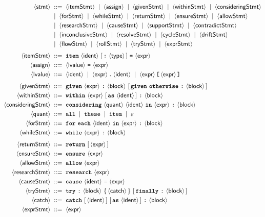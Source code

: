 \documentclass[11pt,a4paper]{article}
\theoremstyle{plain}
\theoremstyle{definition}
\theoremstyle{remark}
\newcommand{\nt}[1]{\ensuremath{\langle\textsf{#1}\rangle}}  %
\newcommand{\tm}[1]{\textbf{\texttt{#1}}}                 %
\newcommand{\opt}[1]{\ensuremath{[\,#1\,]}}               %
\newcommand{\rep}[1]{\ensuremath{\{\,#1\,\}}}             %
\newcommand{\bnfeq}{\;::=\;}
\newcommand{\bnfor}{\;\mid\;}
\begin{document}
\begin{align*}
\nt{stmt}      &\bnfeq \nt{itemStmt} \bnfor \nt{assign} \bnfor \nt{givenStmt}
                       \bnfor \nt{withinStmt} \bnfor \nt{consideringStmt}\\
               &\bnfor \nt{forStmt} \bnfor \nt{whileStmt} \bnfor \nt{returnStmt}
                       \bnfor \nt{ensureStmt} \bnfor \nt{allowStmt}\\
               &\bnfor \nt{researchStmt} \bnfor \nt{causeStmt}
                       \bnfor \nt{supportStmt} \bnfor \nt{contradictStmt}\\
               &\bnfor \nt{inconclusiveStmt} \bnfor \nt{resolveStmt}
                       \bnfor \nt{cycleStmt} \bnfor \nt{driftStmt}\\
               &\bnfor \nt{flowStmt} \bnfor \nt{rollStmt} \bnfor \nt{tryStmt}
                       \bnfor \nt{exprStmt}\\[4pt]
\nt{itemStmt}  &\bnfeq \tm{item}\ \nt{ident}\ \opt{\texttt{:}\ \nt{type}}\
                       \texttt{=}\ \nt{expr}\\
\nt{assign}    &\bnfeq \nt{lvalue}\ \texttt{=}\ \nt{expr}\\
\nt{lvalue}    &\bnfeq \nt{ident} \bnfor \nt{expr}\,\texttt{.}\,\nt{ident}
                       \bnfor \nt{expr}\,\texttt{[}\,\nt{expr}\,\texttt{]}\\[4pt]
\nt{givenStmt} &\bnfeq \tm{given}\ \nt{expr}\ \texttt{:}\ \nt{block}\
                       \opt{\tm{given}\ \tm{otherwise}\ \texttt{:}\ \nt{block}}\\
\nt{withinStmt}&\bnfeq \tm{within}\ \nt{expr}\ \opt{\tm{as}\ \nt{ident}}\
                       \texttt{:}\ \nt{block}\\
\nt{consideringStmt}&\bnfeq \tm{considering}\ \nt{quant}\ \nt{ident}\ \tm{in}\
                       \nt{expr}\ \texttt{:}\ \nt{block}\\
\nt{quant}     &\bnfeq \texttt{all} \bnfor \texttt{these} \bnfor \texttt{item}
                       \bnfor \varepsilon\\
\nt{forStmt}   &\bnfeq \tm{for}\ \tm{each}\ \nt{ident}\ \tm{in}\ \nt{expr}\
                       \texttt{:}\ \nt{block}\\
\nt{whileStmt} &\bnfeq \tm{while}\ \nt{expr}\ \texttt{:}\ \nt{block}\\[4pt]
\nt{returnStmt}&\bnfeq \tm{return}\ \opt{\nt{expr}}\\
\nt{ensureStmt}&\bnfeq \tm{ensure}\ \nt{expr}\\
\nt{allowStmt} &\bnfeq \tm{allow}\ \nt{expr}\\
\nt{researchStmt}&\bnfeq \tm{research}\ \nt{expr}\\
\nt{causeStmt} &\bnfeq \tm{cause}\ \nt{ident}\ \texttt{=}\ \nt{expr}\\
\nt{tryStmt}   &\bnfeq \tm{try}\ \texttt{:}\ \nt{block}\
                       \rep{\nt{catch}}\ \opt{\tm{finally}\ \texttt{:}\
                       \nt{block}}\\
\nt{catch}     &\bnfeq \tm{catch}\ \opt{\nt{ident}}\ \opt{\tm{as}\ \nt{ident}}\
                       \texttt{:}\ \nt{block}\\
\nt{exprStmt}  &\bnfeq \nt{expr}
\end{align*}
\end{document}
